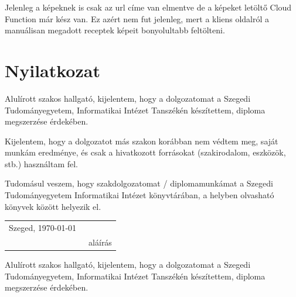 \documentclass[12pt]{report}
\theoremstyle{definition}
\begin{document}
Jelenleg a képeknek is csak az url címe van elmentve de a képeket letöltő Cloud Function már kész van. Ez azért nem fut jelenleg, mert a kliens oldalról a manuálisan megadott receptek képeit bonyolultabb feltölteni. 


\chapter*{Nyilatkozat}




\noindent
Alulírott \makebox[4cm]{\dotfill} szakos hallgató, kijelentem, hogy a dolgozatomat a Szegedi Tudományegyetem, Informatikai Intézet \makebox[4cm]{\dotfill} Tanszékén készítettem, \makebox[4cm]{\dotfill} diploma megszerzése érdekében.

Kijelentem, hogy a dolgozatot más szakon korábban nem védtem meg, saját munkám eredménye, és csak a hivatkozott forrásokat (szakirodalom, eszközök, stb.) használtam fel.

Tudomásul veszem, hogy szakdolgozatomat / diplomamunkámat a Szegedi Tudományegyetem Informatikai Intézet könyvtárában, a helyben olvasható könyvek között helyezik el.

\vspace*{2cm}

\begin{tabular}{lc}
	Szeged, \today\
	\hspace{2cm} & \makebox[6cm]{\dotfill} \\
	             & aláírás                 \\
\end{tabular}


\vspace*{4cm}


\noindent
Alulírott \makebox[4cm]{\dotfill} szakos hallgató, kijelentem, hogy a dolgozatomat a Szegedi Tudományegyetem, Informatikai Intézet \makebox[4cm]{\dotfill} Tanszékén készítettem, \makebox[4cm]{\dotfill} diploma megszerzése érdekében.
\end{document}
